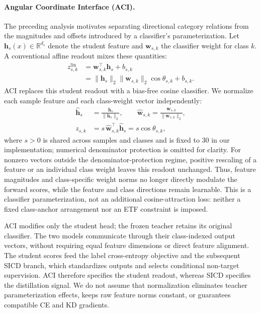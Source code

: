 \paragraph{Angular Coordinate Interface (ACI).}
The preceding analysis motivates separating directional category relations from
the magnitudes and offsets introduced by a classifier's parameterization.
Let $\mathbf{h}_s(x)\in\mathbb{R}^{d_s}$ denote the student feature and
$\mathbf{w}_{s,k}$ the classifier weight for class $k$. A conventional affine
readout mixes these quantities:
\begin{equation}
  \begin{aligned}
    z^{\mathrm{lin}}_{s,k}
    &= \mathbf{w}_{s,k}^{\top}\mathbf{h}_s+b_{s,k}\\
    &= \|\mathbf{h}_s\|_2\|\mathbf{w}_{s,k}\|_2
      \cos\theta_{s,k}+b_{s,k}.
  \end{aligned}
  \label{eq:aci_affine}
\end{equation}
ACI replaces this student readout with a bias-free cosine classifier.
We normalize each sample feature and each class-weight vector independently:
\begin{equation}
  \begin{aligned}
    \hat{\mathbf{h}}_s&=\frac{\mathbf{h}_s}{\|\mathbf{h}_s\|_2},\qquad
    \hat{\mathbf{w}}_{s,k}=\frac{\mathbf{w}_{s,k}}{\|\mathbf{w}_{s,k}\|_2},\\
    z_{s,k}&=s\,\hat{\mathbf{w}}_{s,k}^{\top}\hat{\mathbf{h}}_s
            =s\cos\theta_{s,k},
  \end{aligned}
  \label{eq:aci_cosine}
\end{equation}
where $s>0$ is shared across samples and classes and is fixed to $30$ in our
implementation; numerical denominator protection is omitted for clarity.
For nonzero vectors outside the denominator-protection regime, positive
rescaling of a feature or an individual class weight leaves this readout
unchanged. Thus, feature magnitudes and class-specific weight norms no longer
directly modulate the forward scores, while the feature and class directions
remain learnable. This is a classifier parameterization, not an additional
cosine-attraction loss: neither a fixed class-anchor arrangement nor an ETF
constraint is imposed.

ACI modifies only the student head; the frozen teacher retains its original
classifier. The two models communicate through their class-indexed output
vectors, without requiring equal feature dimensions or direct feature alignment.
The student scores feed the label cross-entropy objective and the subsequent
SICD branch, which standardizes outputs and selects conditional non-target
supervision. ACI therefore specifies the student readout, whereas SICD specifies
the distillation signal. We do not assume that normalization eliminates teacher
parameterization effects, keeps raw feature norms constant, or guarantees
compatible CE and KD gradients.
